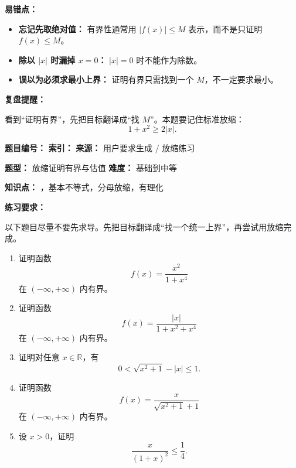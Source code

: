 \begin{mistakeBox}
\textbf{易错点：}

\begin{itemize}
  \item \textbf{忘记先取绝对值：} 有界性通常用 \(|f(x)|\le M\) 表示，而不是只证明 \(f(x)\le M\)。
  \item \textbf{除以 \(|x|\) 时漏掉 \(x=0\)：} \(|x|=0\) 时不能作为除数。
  \item \textbf{误以为必须求最小上界：} 证明有界只需找到一个 \(M\)，不一定要求最小。
\end{itemize}

\textbf{复盘提醒：}

看到“证明有界”，先把目标翻译成“找 \(M\)”。本题要记住标准放缩：
\[
1+x^2\ge 2|x|.
\]
\end{mistakeBox}


\begin{problemBox}
\begin{problemMeta}
\textbf{题目编号：}  \quad
\textbf{索引：}  \quad
\textbf{来源：} 用户要求生成 / 放缩练习

\textbf{题型：} 放缩证明有界与估值 \quad
\textbf{难度：} 基础到中等

\textbf{知识点：} ，基本不等式，分母放缩，有理化
\end{problemMeta}

\textbf{练习要求：}

以下题目尽量不要先求导。先把目标翻译成“找一个统一上界”，再尝试用放缩完成。

\begin{enumerate}
  \item 证明函数
  \[
  f(x)=\frac{x^2}{1+x^4}
  \]
  在 \((-\infty,+\infty)\) 内有界。

  \item 证明函数
  \[
  f(x)=\frac{|x|}{1+x^2+x^4}
  \]
  在 \((-\infty,+\infty)\) 内有界。

  \item 证明对任意 \(x\in\mathbb{R}\)，有
  \[
  0<\sqrt{x^2+1}-|x|\le 1.
  \]

  \item 证明函数
  \[
  f(x)=\frac{x}{\sqrt{x^2+1}+1}
  \]
  在 \((-\infty,+\infty)\) 内有界。

  \item 设 \(x>0\)，证明
  \[
  \frac{x}{(1+x)^2}\le \frac14.
  \]
\end{enumerate}
\end{problemBox}

